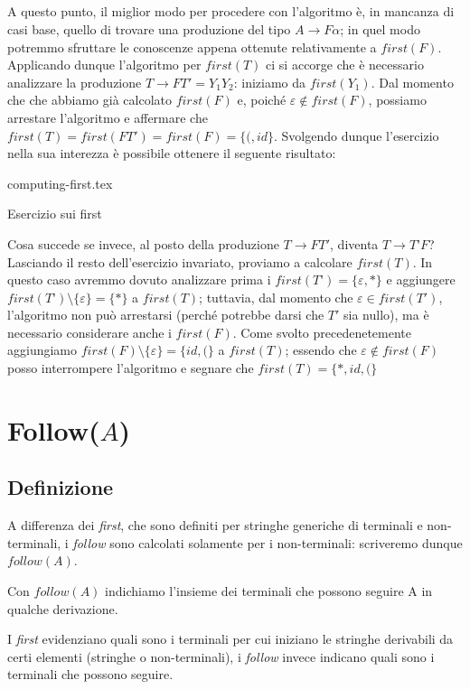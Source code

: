 \documentclass[class=book, crop=false, oneside, 12pt]{standalone}
\begin{document}
\subparagraph{}
A questo punto, il miglior modo per procedere con l'algoritmo è, in mancanza di casi base, quello di trovare una produzione del tipo \(A \rightarrow F\alpha\); in quel modo potremmo sfruttare le conoscenze appena ottenute relativamente a \(first(F)\). Applicando dunque l'algoritmo per \(first(T)\) ci si accorge che è necessario analizzare la produzione \(T \rightarrow FT' = Y_1Y_2\): iniziamo da \(first(Y_1)\). Dal momento che che abbiamo già calcolato \(first(F)\) e, poiché \(\varepsilon \notin first(F)\), possiamo arrestare l'algoritmo e affermare che \(first(T) = first(FT') = first(F) = \{(, id\}\). Svolgendo dunque l'esercizio nella sua interezza è possibile ottenere il seguente risultato:
\begin{table}[H]
	\centering
	{computing-first.tex}
    \caption{Esercizio sui first}
    \label{computing-first}
\end{table}
Cosa succede se invece, al posto della produzione \(T \to FT'\), diventa \(T \to T’F\)? Lasciando il resto dell'esercizio invariato, proviamo a calcolare \(first(T)\). In questo caso avremmo dovuto analizzare prima i \(first(T’) = \{\varepsilon, \ast\}\) e aggiungere \(first(T’) \setminus \{\varepsilon\} = \{\ast\}\) a \(first(T)\); tuttavia, dal momento che \(\varepsilon \in first(T')\), l’algoritmo non può arrestarsi (perché potrebbe darsi che \(T'\) sia nullo), ma è necessario considerare anche i \(first(F)\). Come svolto precedenetemente aggiungiamo \(first(F) \setminus \{\varepsilon\} = \{id, (\}\) a \(first(T)\); essendo che \(\varepsilon \notin first(F)\) posso interrompere l'algoritmo e segnare che \(first(T) = \{\ast, id, (\}\)

\section{Follow(\(A\))}
\subsection{Definizione}
A differenza dei \emph{first}, che sono definiti per stringhe generiche di terminali e non-terminali, i \emph{follow} sono calcolati solamente per i non-terminali: scriveremo dunque \(follow(A)\).
\begin{definition}
    Con \(follow(A)\) indichiamo l'insieme dei terminali che possono seguire A in qualche derivazione.    
\end{definition}
I \emph{first} evidenziano quali sono i terminali per cui iniziano le stringhe derivabili da certi elementi (stringhe o non-terminali), i \emph{follow} invece indicano quali sono i terminali che possono seguire.
\end{document}
